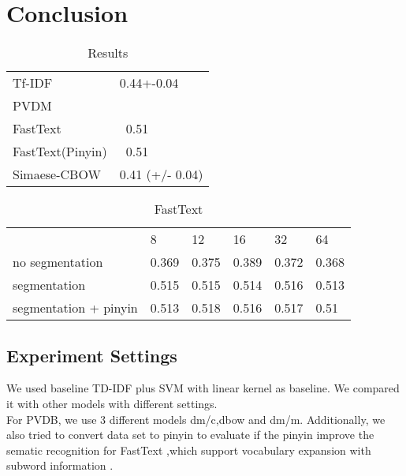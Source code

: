 \chapter{Conclusion}

\begin{table}[]
\centering
\caption{Results}
\label{resultAll}
\begin{tabular}{ll}
Tf-IDF   & 0.44+-0.04 \\
PVDM &     \\
FastText &  ~0.51   \\
FastText(Pinyin) &  ~0.51  \\
Simaese-CBOW & 0.41 (+/- 0.04)    
\end{tabular}
\end{table}

\begin{table}[]
\centering
\caption{FastText}
\label{fasttext}
\begin{tabular}{llllll}
   & 8 & 12 & 16 & 32 & 64 \\
no segmentation  & 0.369 & 0.375 & 0.389 & 0.372 & 0.368 \\
segmentation  & 0.515 & 0.515 & 0.514 & 0.516 & 0.513 \\
segmentation + pinyin  & 0.513 & 0.518 & 0.516 & 0.517 & 0.51 \\  
\end{tabular}
\end{table}



\section{Experiment Settings}


We used baseline TD-IDF plus SVM with linear kernel as baseline. We compared it with other models with different settings. \\

For PVDB, we use 3 different models dm/c,dbow and dm/m. Additionally, we also tried to convert data set to pinyin to evaluate if the pinyin improve the sematic recognition for FastText ,which support vocabulary expansion with subword information \cite{bojanowski2016enriching}. 